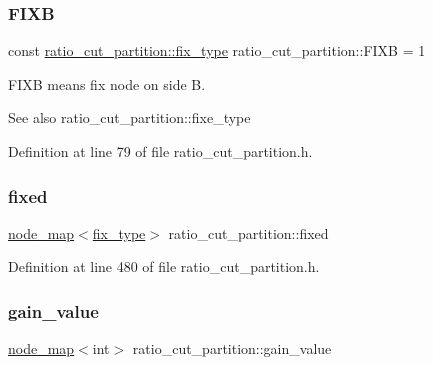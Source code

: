 \subsubsection{\texorpdfstring{F\+I\+XB}{FIXB}}
{\footnotesize\ttfamily const \mbox{\hyperlink{classratio__cut__partition_a558dda40abda8ab03edb4605dbb81e36}{ratio\+\_\+cut\+\_\+partition\+::fix\+\_\+type}} ratio\+\_\+cut\+\_\+partition\+::\+F\+I\+XB = 1\hspace{0.3cm}{\ttfamily [static]}}

{\ttfamily F\+I\+XB} means fix node on side {\ttfamily B}.

\begin{DoxySeeAlso}{See also}
ratio\+\_\+cut\+\_\+partition\+::fixe\+\_\+type 
\end{DoxySeeAlso}


Definition at line 79 of file ratio\+\_\+cut\+\_\+partition.\+h.

\mbox{\label{classratio__cut__partition_ad77023b9f60e88274bf54f2019404768}} 
\subsubsection{\texorpdfstring{fixed}{fixed}}
{\footnotesize\ttfamily \mbox{\hyperlink{classnode__map}{node\+\_\+map}}$<$\mbox{\hyperlink{classratio__cut__partition_a558dda40abda8ab03edb4605dbb81e36}{fix\+\_\+type}}$>$ ratio\+\_\+cut\+\_\+partition\+::fixed\hspace{0.3cm}{\ttfamily [protected]}}



Definition at line 480 of file ratio\+\_\+cut\+\_\+partition.\+h.

\mbox{\label{classratio__cut__partition_af24ff191abbb0578f0bfc54fef5f6d45}} 
\subsubsection{\texorpdfstring{gain\+\_\+value}{gain\_value}}
{\footnotesize\ttfamily \mbox{\hyperlink{classnode__map}{node\+\_\+map}}$<$int$>$ ratio\+\_\+cut\+\_\+partition\+::gain\+\_\+value\hspace{0.3cm}{\ttfamily [protected]}}



